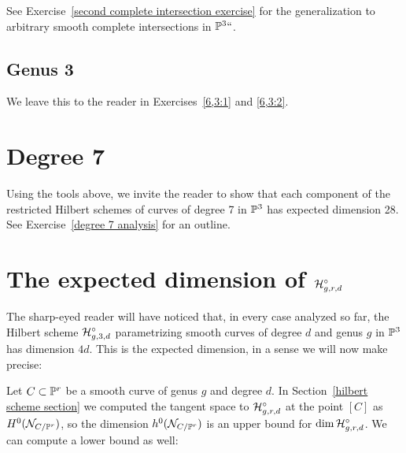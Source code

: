 See Exercise~\ref{second complete intersection exercise} for the
generalization to arbitrary smooth complete intersections in $\PP^3` `$.

\subsection*{Genus 3}
We leave this to the reader in Exercises~\ref{6,3:1}
and
\ref{6,3:2}.

\section{Degree 7}

Using the tools above, we invite the reader to show that each component
of the restricted Hilbert schemes of curves of degree 7
in $\PP^3$ has expected dimension 28. See Exercise~\ref{degree 7 analysis}
for an outline.


\section{The expected dimension of
\texorpdfstring{$\cH^\circ_{g,r,d}$}{$H_{g,r,d}$}}\label{chi N}


The sharp-eyed reader will have noticed that,
in every case analyzed so far,  the Hilbert scheme
$\cH^\circ_{g,3,d}$ parametrizing smooth curves of degree $d$ and genus
%
$g$ in $\PP^3$ has dimension $4d$.
This is the
expected dimension,
%
in a sense we will now make precise:

Let $C\subset \PP^r$ be a smooth curve of genus $g$ and degree $d$. In
Section~\ref{hilbert scheme section}
we computed the tangent space to $\cH^\circ_{g,r,d}$ at the point $[C]$
as $H^0(\sN_{C/\PP^r})$, so
the dimension $h^0( \sN_{C/\PP^r})$ is an upper bound for $\dim
\cH^\circ_{g,r,d}$. We can compute a lower bound as well:

